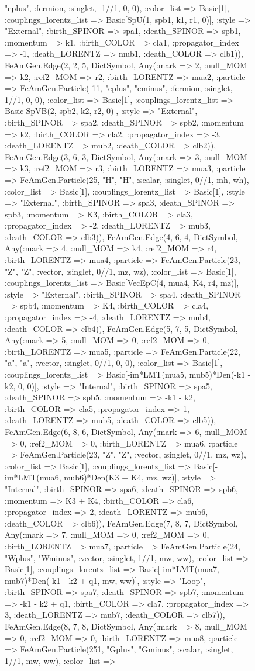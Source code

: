 \documentclass{revtex4}
\begin{document}
\begin{figure}[!htb]
\begin{center}
{"eplus", :fermion, :singlet, -1//1, 0, 0), :color_list => Basic[1], :couplings_lorentz_list => Basic[SpU(1, spb1, k1, r1, 0)], :style => "External", :birth_SPINOR => spa1, :death_SPINOR => spb1, :momentum => k1, :birth_COLOR => cla1, :propagator_index => -1, :death_LORENTZ => mub1, :death_COLOR => clb1)), FeAmGen.Edge(2, 2, 5, Dict{Symbol, Any}(:mark => 2, :null_MOM => k2, :ref2_MOM => r2, :birth_LORENTZ => mua2, :particle => FeAmGen.Particle(-11, "eplus", "eminus", :fermion, :singlet, 1//1, 0, 0), :color_list => Basic[1], :couplings_lorentz_list => Basic[SpVB(2, spb2, k2, r2, 0)], :style => "External", :birth_SPINOR => spa2, :death_SPINOR => spb2, :momentum => k2, :birth_COLOR => cla2, :propagator_index => -3, :death_LORENTZ => mub2, :death_COLOR => clb2)), FeAmGen.Edge(3, 6, 3, Dict{Symbol, Any}(:mark => 3, :null_MOM => k3, :ref2_MOM => r3, :birth_LORENTZ => mua3, :particle => FeAmGen.Particle(25, "H", "H", :scalar, :singlet, 0//1, mh, wh), :color_list => Basic[1], :couplings_lorentz_list => Basic[1], :style => "External", :birth_SPINOR => spa3, :death_SPINOR => spb3, :momentum => K3, :birth_COLOR => cla3, :propagator_index => -2, :death_LORENTZ => mub3, :death_COLOR => clb3)), FeAmGen.Edge(4, 6, 4, Dict{Symbol, Any}(:mark => 4, :null_MOM => k4, :ref2_MOM => r4, :birth_LORENTZ => mua4, :particle => FeAmGen.Particle(23, "Z", "Z", :vector, :singlet, 0//1, mz, wz), :color_list => Basic[1], :couplings_lorentz_list => Basic[VecEpC(4, mua4, K4, r4, mz)], :style => "External", :birth_SPINOR => spa4, :death_SPINOR => spb4, :momentum => K4, :birth_COLOR => cla4, :propagator_index => -4, :death_LORENTZ => mub4, :death_COLOR => clb4)), FeAmGen.Edge(5, 7, 5, Dict{Symbol, Any}(:mark => 5, :null_MOM => 0, :ref2_MOM => 0, :birth_LORENTZ => mua5, :particle => FeAmGen.Particle(22, "a", "a", :vector, :singlet, 0//1, 0, 0), :color_list => Basic[1], :couplings_lorentz_list => Basic[-im*LMT(mua5, mub5)*Den(-k1 - k2, 0, 0)], :style => "Internal", :birth_SPINOR => spa5, :death_SPINOR => spb5, :momentum => -k1 - k2, :birth_COLOR => cla5, :propagator_index => 1, :death_LORENTZ => mub5, :death_COLOR => clb5)), FeAmGen.Edge(6, 8, 6, Dict{Symbol, Any}(:mark => 6, :null_MOM => 0, :ref2_MOM => 0, :birth_LORENTZ => mua6, :particle => FeAmGen.Particle(23, "Z", "Z", :vector, :singlet, 0//1, mz, wz), :color_list => Basic[1], :couplings_lorentz_list => Basic[-im*LMT(mua6, mub6)*Den(K3 + K4, mz, wz)], :style => "Internal", :birth_SPINOR => spa6, :death_SPINOR => spb6, :momentum => K3 + K4, :birth_COLOR => cla6, :propagator_index => 2, :death_LORENTZ => mub6, :death_COLOR => clb6)), FeAmGen.Edge(7, 8, 7, Dict{Symbol, Any}(:mark => 7, :null_MOM => 0, :ref2_MOM => 0, :birth_LORENTZ => mua7, :particle => FeAmGen.Particle(24, "Wplus", "Wminus", :vector, :singlet, 1//1, mw, ww), :color_list => Basic[1], :couplings_lorentz_list => Basic[-im*LMT(mua7, mub7)*Den(-k1 - k2 + q1, mw, ww)], :style => "Loop", :birth_SPINOR => spa7, :death_SPINOR => spb7, :momentum => -k1 - k2 + q1, :birth_COLOR => cla7, :propagator_index => 3, :death_LORENTZ => mub7, :death_COLOR => clb7)), FeAmGen.Edge(8, 7, 8, Dict{Symbol, Any}(:mark => 8, :null_MOM => 0, :ref2_MOM => 0, :birth_LORENTZ => mua8, :particle => FeAmGen.Particle(251, "Gplus", "Gminus", :scalar, :singlet, 1//1, mw, ww), :color_list => }
\end{center}
\end{figure}
\end{document}
